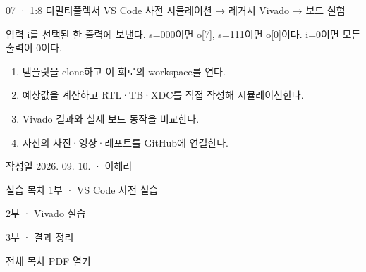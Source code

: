 
\renewcommand{\labonehome}{\hyperlink{legacy-07-contents}{\contentsbutton}}
\renewcommand{\legacySource}[1]{}
\providecommand{\terminalbox}[1]{\par\vspace{0.15cm}{\setlength{\fboxsep}{7pt}\colorbox{black}{\parbox{\dimexpr\textwidth-14pt\relax}{\color{white}\ttfamily\fontsize{7}{9}\selectfont #1}}}\par\vspace{0.15cm}}

\begingroup
\renewcommand{\small}{\fontsize{9}{11}\selectfont}
\begin{frame}{07 · 1:8 디멀티플렉서}\relax
\small
VS Code 사전 시뮬레이션 → 레거시 Vivado → 보드 실험\par\vspace{0.22cm}입력 i를 선택된 한 출력에 보낸다. s=000이면 o[7], s=111이면 o[0]이다. i=0이면 모든 출력이 0이다.\par\begin{enumerate}\setlength{\itemsep}{0.22cm}
\item 템플릿을 clone하고 이 회로의 workspace를 연다.
\item 예상값을 계산하고 RTL·TB·XDC를 직접 작성해 시뮬레이션한다.
\item Vivado 결과와 실제 보드 동작을 비교한다.
\item 자신의 사진·영상·레포트를 GitHub에 연결한다.
\end{enumerate}
작성일 2026. 09. 10. · 이해리\par
\end{frame}

\begin{frame}[label=legacy-07-contents]{실습 목차}\relax
\small
1부 · VS Code 사전 실습\par{}\par\vspace{0.2cm}
\par\vspace{0.4cm}
2부 · Vivado 실습\par{}\par\vspace{0.4cm}
3부 · 결과 정리\par{}\par\vspace{0.35cm}
\href{04.LAB1_00_CONTENTS.pdf}{전체 목차 PDF 열기}
\end{frame}


